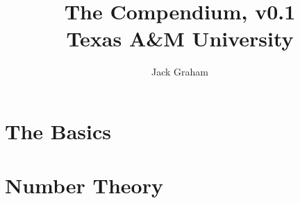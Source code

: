 \documentclass{report}
\title{
	{The Compendium, v0.1}\\
	{Texas A\&M University}
}
\author{Jack Graham}
\begin{document}
\maketitle

\tableofcontents

\chapter{The Basics}
  

\chapter{Number Theory}
  
\end{document}
